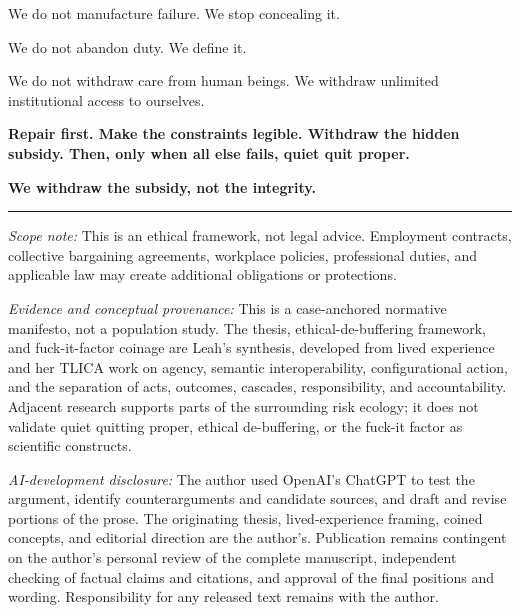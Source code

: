 \documentclass[11pt,oneside]{article}
\begin{document}
We do not manufacture failure. We stop concealing it.

We do not abandon duty. We define it.

We do not withdraw care from human beings. We withdraw unlimited
institutional access to ourselves.

\textbf{Repair first. Make the constraints legible. Withdraw the hidden
subsidy. Then, only when all else fails, quiet quit proper.}

\textbf{We withdraw the subsidy, not the integrity.}

\begin{center}\rule{0.5\linewidth}{0.5pt}\end{center}

\emph{Scope note:} This is an ethical framework, not legal advice.
Employment contracts, collective bargaining agreements, workplace
policies, professional duties, and applicable law may create additional
obligations or protections.

\emph{Evidence and conceptual provenance:} This is a case-anchored
normative manifesto, not a population study. The thesis,
ethical-de-buffering framework, and fuck-it-factor coinage are Leah's
synthesis, developed from lived experience and her TLICA work on agency,
semantic interoperability, configurational action, and the separation of
acts, outcomes, cascades, responsibility, and accountability. Adjacent
research supports parts of the surrounding risk ecology; it does not
validate quiet quitting proper, ethical de-buffering, or the fuck-it
factor as scientific constructs.

\emph{AI-development disclosure:} The author used OpenAI's ChatGPT to
test the argument, identify counterarguments and candidate sources, and
draft and revise portions of the prose. The originating thesis,
lived-experience framing, coined concepts, and editorial direction are
the author's. Publication remains contingent on the author's personal
review of the complete manuscript, independent checking of factual
claims and citations, and approval of the final positions and wording.
Responsibility for any released text remains with the author.

\clearpage
\begingroup
\sloppy
\footnotesize
\setlength{\parskip}{0.08em}
\theendnotes
\endgroup
\end{document}
